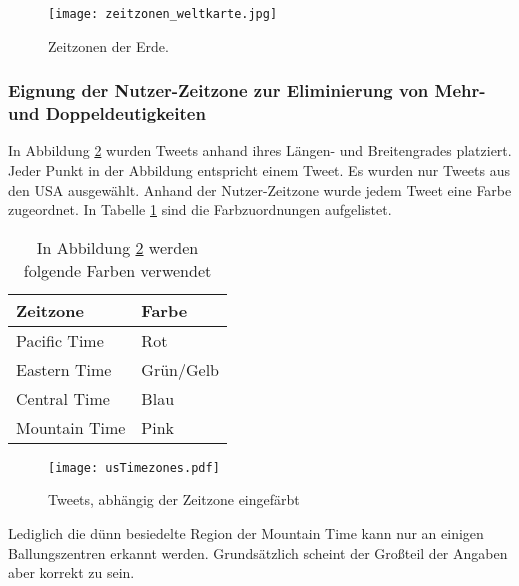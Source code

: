 					\begin{figure}[!ht]
						\begin{center}
							\texttt{[image: zeitzonen\_weltkarte.jpg]}
							\caption{Zeitzonen der Erde.}
							\label{img:timezones}
						\end{center}
					\end{figure}	

				\subsubsection{Eignung der Nutzer-Zeitzone zur Eliminierung von Mehr- und Doppeldeutigkeiten}

					In Abbildung \ref{img:usTimezones} wurden Tweets anhand ihres Längen- und Breitengrades platziert.
					Jeder Punkt in der Abbildung entspricht einem Tweet.
					Es wurden nur Tweets aus den USA ausgewählt.
					Anhand der Nutzer-Zeitzone wurde jedem Tweet eine Farbe zugeordnet.
					In Tabelle \ref{tab:timezoneColors} sind die Farbzuordnungen aufgelistet. 

					\begin{table}[h]
					\centering
					\caption{In Abbildung \ref{img:usTimezones} werden folgende Farben verwendet}
					\label{tab:timezoneColors}
						\begin{tabular}{|l|l|}
							\hline
							Zeitzone      & Farbe     \\ \hline \hline
							Pacific Time  & Rot       \\ \hline
							Eastern Time  & Grün/Gelb \\ \hline
							Central Time  & Blau      \\ \hline
							Mountain Time & Pink      \\ \hline
						\end{tabular}
					\end{table}

					 \begin{figure}[!ht]
						\begin{center}
							\texttt{[image: usTimezones.pdf]}
							\caption{Tweets, abhängig der Zeitzone eingefärbt}
							\label{img:usTimezones}
						\end{center}
					\end{figure}	

					Lediglich die dünn besiedelte Region der Mountain Time kann nur an einigen Ballungszentren erkannt werden. 
					Grundsätzlich scheint der Großteil der Angaben aber korrekt zu sein.


